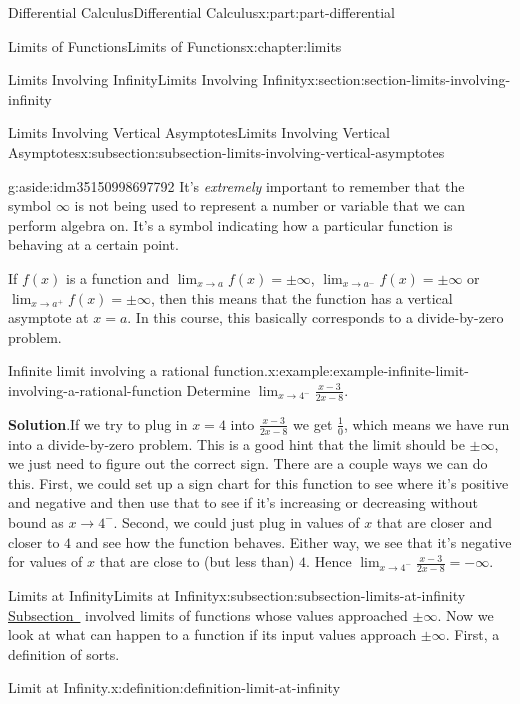 \documentclass[twoside,10pt,]{tufte-book}
\newcommand{\blocktitlefont}{\relax}
\numberwithin{equation}{part}
\begin{document}
\begin{partptx}{Differential Calculus}{}{Differential Calculus}{}{}{x:part:part-differential}
\begin{chapterptx}{Limits of Functions}{}{Limits of Functions}{}{}{x:chapter:limits}
\begin{sectionptx}{Limits Involving Infinity}{}{Limits Involving Infinity}{}{}{x:section:section-limits-involving-infinity}
\begin{subsectionptx}{Limits Involving Vertical Asymptotes}{}{Limits Involving Vertical Asymptotes}{}{}{x:subsection:subsection-limits-involving-vertical-asymptotes}
\begin{aside}{}{g:aside:idm35150998697792}%
It's \emph{extremely} important to remember that the symbol \(\infty\) is not being used to represent a number or variable that we can perform algebra on. It's a symbol indicating how a particular function is behaving at a certain point.%
\end{aside}
If \(f(x)\) is a function and \(\lim_{x\to a}f(x)=\pm\infty\), \(\lim_{x\to a^{-}}f(x)=\pm\infty\) or \(\lim_{x\to a^{+}}f(x)=\pm\infty\), then this means that the function has a vertical asymptote at \(x=a\). In this course, this basically corresponds to a divide-by-zero problem.%
\begin{example}{Infinite limit involving a rational function.}{x:example:example-infinite-limit-involving-a-rational-function}%
Determine \(\lim_{x\to4^{-}}\frac{x-3}{2x-8}\).%
\par\smallskip%
\noindent\textbf{\blocktitlefont Solution}.\hypertarget{g:solution:idm35150998693056}{}\quad{}If we try to plug in \(x=4\) into \(\frac{x-3}{2x-8}\) we get \(\frac{1}{0}\), which means we have run into a divide-by-zero problem. This is a good hint that the limit should be \(\pm\infty\), we just need to figure out the correct sign. There are a couple ways we can do this. First, we could set up a sign chart for this function to see where it's positive and negative and then use that to see if it's increasing or decreasing without bound as \(x\to4^{-}\). Second, we could just plug in values of \(x\) that are closer and closer to \(4\) and see how the function behaves. Either way, we see that it's negative for values of \(x\) that are close to (but less than) \(4\). Hence \(\lim_{x\to4^{-}}\frac{x-3}{2x-8}=-\infty\).%
\end{example}
\end{subsectionptx}
%
%
\typeout{************************************************}
\typeout{************************************************}
%
\begin{subsectionptx}{Limits at Infinity}{}{Limits at Infinity}{}{}{x:subsection:subsection-limits-at-infinity}
\hyperref[x:subsection:subsection-limits-involving-vertical-asymptotes]{Subsection~} involved limits of functions whose values approached \(\pm\infty\). Now we look at what can happen to a function if its input values approach \(\pm\infty\). First, a definition of sorts.%
\begin{definition}{Limit at Infinity.}{x:definition:definition-limit-at-infinity}%

\end{definition}
\end{subsectionptx}
\end{sectionptx}
\end{chapterptx}
\end{partptx}
\end{document}
